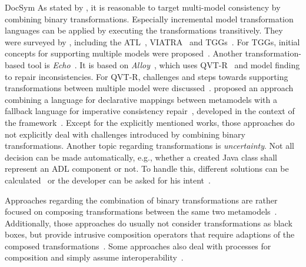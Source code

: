\begin{copiedFrom}{DocSym}
As stated by \textcite{stevens2020BidirectionalTransformationLarge-SoSym}, it is reasonable to target multi-model consistency by combining binary transformations.
Especially incremental model transformation languages %
can be applied by executing the transformations transitively.
They were surveyed by \textcite{etzlstorfer2013SurveyIncrementalTransformation-ME}, including the \gls{ATL}~\cite{jouault2006a,xiong2007a}, VIATRA~\cite{bergmann2015viatra} and \glspl{TGG}~\cite{anjorin2014b,anjorin2014c}. 
For \glspl{TGG}, initial concepts for supporting multiple models were proposed~\cite{trollmann2015TransformationTGGtoMultiModel-ICMT,trollmann2016SynchronizationTGGtoMultiModel-ICMT}. 
Another transformation-based tool is \emph{Echo}~\cite{macedo2013b}. 
It is based on \emph{Alloy}~\cite{macedo2013a}, which uses \mbox{QVT-R}~\cite{qvt} and model finding to repair inconsistencies. 
For \mbox{QVT-R}, challenges and steps towards supporting transformations between multiple model were discussed~\cite{macedo2014FrameworkMultiDirectional-BX}.
\citeauthor{kramer2017a} proposed an approach combining a language for declarative mappings between metamodels with a fallback language for imperative consistency repair~\cite{kramer2017a, klare2016b}, developed in the context of the \vitruv framework~\cite{kramer2015a}. %
Except for the explicitly mentioned works, those approaches do not explicitly deal with challenges introduced by combining binary transformations.
Another topic regarding transformations is \emph{uncertainty}. Not all decision can be made automatically, e.g., whether a created Java class shall represent an \gls{ADL} component or not. To handle this, different solutions can be calculated~\cite{eramo2015uncertainty-SLE} or the developer can be asked for his intent~\cite{langhammer2014a}.

Approaches regarding the combination of binary transformations are rather focused on composing transformations between the same two metamodels~\cite{wagelaar2008a, wagelaar2010a, wagelaar2011a}.
Additionally, those approaches do usually not consider transformations as black boxes, but provide intrusive composition operators that require adaptions of the composed transformations~\cite{cuadrado2008a}.
Some approaches also deal with processes for %
composition %
and simply assume interoperability~\cite{oldevik2005a}.


\end{copiedFrom}
